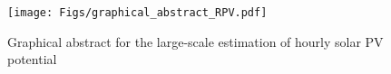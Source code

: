 \begin{figure}[tb]
\centering\texttt{[image: Figs/graphical\_abstract\_RPV.pdf]}
\caption{Graphical abstract for the large-scale estimation of hourly solar PV potential}
\label{fig:graphical_abstract_RPV}
\end{figure}

